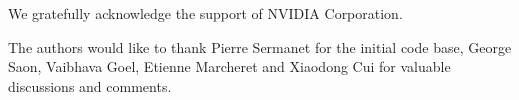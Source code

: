 \documentclass{article}
\begin{document}
We gratefully acknowledge the support of NVIDIA Corporation.

The authors would like to thank Pierre Sermanet for the initial code
base, George Saon, Vaibhava Goel, Etienne Marcheret and Xiaodong Cui for valuable
discussions and comments.




\end{document}
